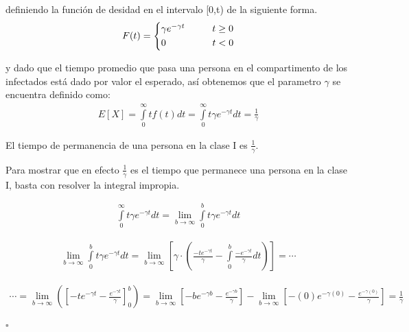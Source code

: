 definiendo la función de desidad en el intervalo [0,t) de la siguiente forma.\\
\begin{equation*}
F(t) =
\begin{cases*}
\gamma e^{-\gamma t} \hspace{1cm} t \geq  0 \\
0 \hspace{1.7cm} t <  0
\end{cases*}
\end{equation*}

y dado que el tiempo promedio que pasa una persona en el compartimento de los infectados está dado por valor el esperado, así obtenemos que el parametro $\gamma$ se encuentra definido como: \\

\begin{align}
E[X] = \int \limits_{0}^{\infty} tf(t)dt = \int \limits_{0}^{\infty} t\gamma e^{-\gamma t} dt = \frac{1}{\gamma}
\end{align}

\begin{Af}
El tiempo de permanencia de una persona en la clase I es $\frac{1}{\gamma}$. \cite{Martcheva}
\end{Af}

\begin{Dem}

Para mostrar que en efecto $\frac{1}{\gamma}$ es el tiempo que permanece una persona en la clase I, basta con resolver la integral impropia.

\begin{align*} 
\int \limits_{0}^{\infty} t\gamma e^{-\gamma t} dt = \lim\limits_{b\rightarrow \infty} \int \limits_{0}^{b} t\gamma e^{-\gamma t}dt 
\end{align*}

\begin{align*}
\lim\limits_{b\rightarrow \infty} \int \limits_{0}^{b} t\gamma e^{-\gamma t}dt = \lim\limits_{b\rightarrow \infty} \left[ \gamma \cdot \left( \frac{-t e^{-\gamma t}}{\gamma} - \int \limits_{0}^{b} \frac{-e^{-\gamma t}}{\gamma} dt \right)\right] = \cdots
\end{align*}

\begin{align*}
\cdots = \lim\limits_{b\rightarrow \infty} \left( \left[ -te^{- \gamma t} - \frac{e^{-\gamma t}}{\gamma} \right]_0^b \right) = \lim\limits_{b\rightarrow \infty} \left[ -be^{- \gamma b} - \frac{e^{- \gamma b}}{\gamma} \right] - \lim\limits_{b\rightarrow \infty} \left[ -(0)e^{- \gamma (0)} - \frac{e^{- \gamma (0)}}{\gamma} \right] = \frac{1}{\gamma}  \\
\end{align*}

\hfill	$\square$

\end{Dem}

